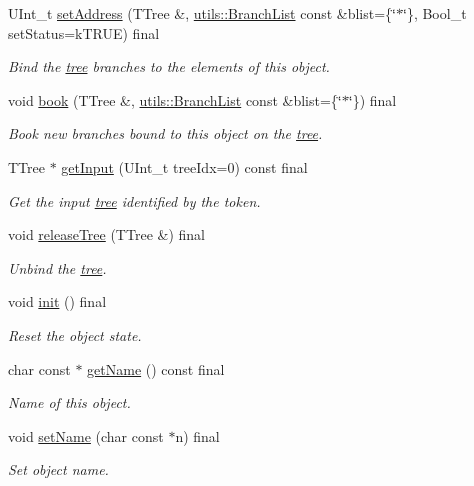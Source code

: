 \begin{DoxyCompactItemize}
UInt\_\-t \hyperlink{classpanda_1_1Singlet_ac5daab18f365a00fe5dbdc887d173e05}{setAddress} (TTree \&, \hyperlink{classpanda_1_1utils_1_1BranchList}{utils::BranchList} const \&blist=\{\char`\"{}$\ast$\char`\"{}\}, Bool\_\-t setStatus=kTRUE) final
\begin{DoxyCompactList}\small\item\em Bind the \hyperlink{namespacepanda_1_1tree}{tree} branches to the elements of this object. \item\end{DoxyCompactList}\item 
void \hyperlink{classpanda_1_1Singlet_a670d14c939ce004ed6207dcddd0890eb}{book} (TTree \&, \hyperlink{classpanda_1_1utils_1_1BranchList}{utils::BranchList} const \&blist=\{\char`\"{}$\ast$\char`\"{}\}) final
\begin{DoxyCompactList}\small\item\em Book new branches bound to this object on the \hyperlink{namespacepanda_1_1tree}{tree}. \item\end{DoxyCompactList}\item 
TTree $\ast$ \hyperlink{classpanda_1_1Singlet_ac0c8b93ca8f4085700bddb786bae4b02}{getInput} (UInt\_\-t treeIdx=0) const final
\begin{DoxyCompactList}\small\item\em Get the input \hyperlink{namespacepanda_1_1tree}{tree} identified by the token. \item\end{DoxyCompactList}\item 
void \hyperlink{classpanda_1_1Singlet_aee6f5070599294eaef7a88b88dad389a}{releaseTree} (TTree \&) final
\begin{DoxyCompactList}\small\item\em Unbind the \hyperlink{namespacepanda_1_1tree}{tree}. \item\end{DoxyCompactList}\item 
void \hyperlink{classpanda_1_1Singlet_aef09da29df235d3cdbb2e870d1ca76cb}{init} () final
\begin{DoxyCompactList}\small\item\em Reset the object state. \item\end{DoxyCompactList}\item 
char const $\ast$ \hyperlink{classpanda_1_1Singlet_a0cadb592bf3f3c40f26cb67a406b582e}{getName} () const final
\begin{DoxyCompactList}\small\item\em Name of this object. \item\end{DoxyCompactList}\item 
void \hyperlink{classpanda_1_1Singlet_a767d4681e6dd335e42b51d24e37b129f}{setName} (char const $\ast$n) final
\begin{DoxyCompactList}\small\item\em Set object name. \item\end{DoxyCompactList}\end{DoxyCompactItemize}
